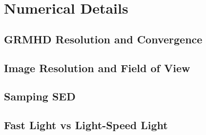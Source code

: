 \documentclass[twocolumn,twocolappendix,tighten,dvipsnames,linenumbers]{aastex63}
\begin{document}
\section{Numerical Details}

\subsection{GRMHD Resolution and Convergence}

\subsection{Image Resolution and Field of View}

\subsection{Samping SED}

\subsection{Fast Light vs Light-Speed Light}

\clearpage




\end{document}
